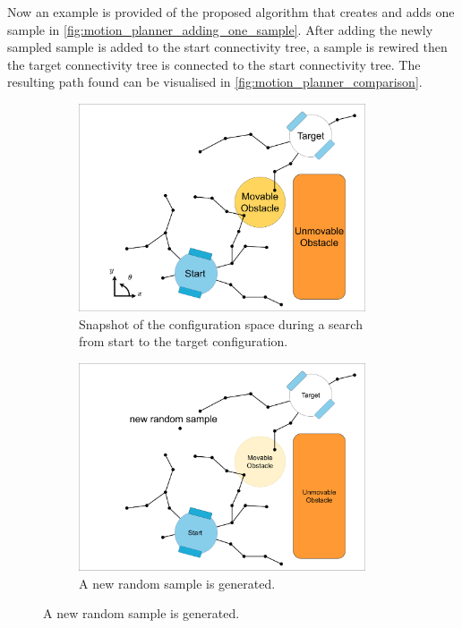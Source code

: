 \begin{algorithm}[H]
\begin{algorithmic}[1]
{{\EndWhile
}}
\end{algorithmic}
\end{algorithm}

\newpage
Now an example is provided of the proposed algorithm that creates and adds one sample in \cref{fig:motion_planner_adding_one_sample}. After adding the newly sampled sample is added to the start connectivity tree, a sample is rewired then the target connectivity tree is connected to the start connectivity tree. The resulting path found can be visualised in \cref{fig:motion_planner_comparison}.\bs

\begin{figure}[H]
    \centering
    \begin{subfigure}{.49\textwidth}
    \centering
    \includegraphics[width=0.93\textwidth, cfbox=my_grey 5pt 0pt]{figures/mp/1mp_init.drawio.png}
    \caption{Snapshot of the configuration space during a search\\from start to the target configuration.}
    \end{subfigure}
    \begin{subfigure}{.49\textwidth}
    \centering
    \includegraphics[width=0.93\textwidth, cfbox=my_light_blue 5pt 0pt]{figures/mp/2mp_new_rand_sample.drawio.png}
    \caption{A new random sample is generated.\bs}
    \end{subfigure}


\end{figure}
